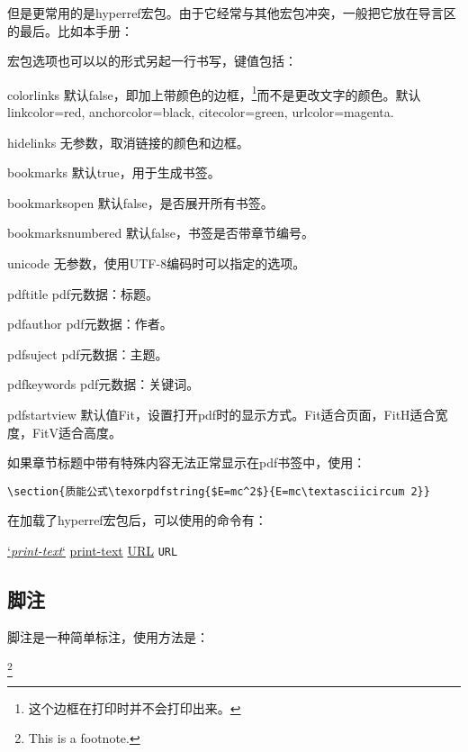 {但是更常用的是hyperref宏包。由于它经常与其他宏包冲突，一般把它放在导言区的最后。比如本手册：
\begin{latex}{}
\usepackage[colorlinks,bookmarksopen=true,
bookmarksnumbered=true]{hyperref}
\end{latex}

宏包选项也可以以\latexline{\\hypersetup}的形式另起一行书写，键值包括：
\begin{para}
\item[colorlinks] 默认false，即加上带颜色的边框，\footnote{这个边框在打印时并不会打印出来。}而不是更改文字的颜色。默认linkcolor=red, anchorcolor=black, citecolor=green, urlcolor=magenta. 
\item[hidelinks] 无参数，取消链接的颜色和边框。
\item[bookmarks] 默认true，用于生成书签。
\item[bookmarksopen] 默认false，是否展开所有书签。
\item[bookmarksnumbered] 默认false，书签是否带章节编号。
\item[unicode] 无参数，使用UTF-8编码时可以指定的选项。
\item[pdftitle] pdf元数据：标题。
\item[pdfauthor] pdf元数据：作者。
\item[pdfsuject] pdf元数据：主题。
\item[pdfkeywords] pdf元数据：关键词。
\item[pdfstartview] 默认值Fit，设置打开pdf时的显示方式。Fit适合页面，FitH适合宽度，FitV适合高度。
\end{para}

如果章节标题中带有特殊内容无法正常显示在pdf书签中，使用：

\begin{verbatim}
\section{质能公式\texorpdfstring{$E=mc^2$}{E=mc\textasciicircum 2}}
\end{verbatim}

在加载了hyperref宏包后，可以使用的命令有：
\begin{latex}{}
\hyperref[`\textit{label-name}`]{`\textit{print-text}`}
\href{URL}{print-text}
\url{URL} %
\nolinkurl{URL} %
\end{latex}

\subsection{脚注}
脚注是一种简单标注，使用方法是：
\begin{latex}{}
\footnote{This is a footnote.}
\end{latex}

}
